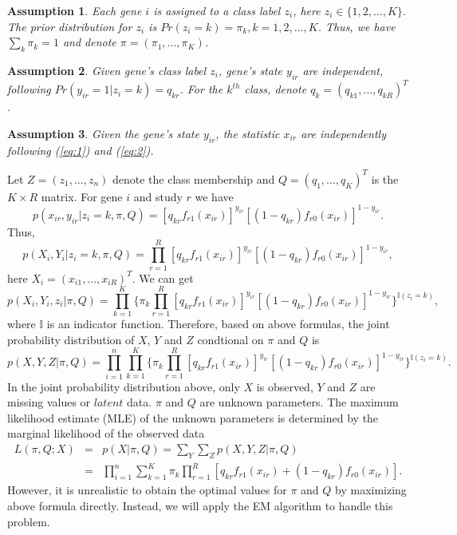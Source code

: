 \documentclass[11pt, oneside]{article}   	%
\newtheorem{assumption}{Assumption}
\begin{document}
\begin{assumption} Each gene $i$ is assigned to a class label $z_i$, here $z_i\in \{1,2,\ldots,K\}$. The prior distribution for $z_i$ is $Pr(z_i=k)=\pi_k, k=1,2,\ldots,K $. Thus, we have $\sum_k \pi_k=1$ and denote $ \pi=(\pi_1,\ldots,\pi_K)$.
\end{assumption}
\begin{assumption} Given gene's class label $z_i$, gene's state $y_{ir}$ are independent, following $ Pr(y_{ir}=1|z_i =k)=q_{kr}$. For the $k^{th}$ class, denote $q_k=(q_{k1},\ldots,q_{kR})^T$. 
\end{assumption}
\begin{assumption}Given the gene's state $y_{ir}$, the statistic $x_{ir}$ are independently following (\ref{eq:1}) and (\ref{eq:2}).
\end{assumption}

Let $Z = (z_1,\ldots,z_n)$ denote the class membership and $ Q = (q_1,\ldots,q_K)^T$ is the $K \times R$ matrix. For gene $i$ and study $r$ we have 
\begin{equation*}
p(x_{ir},y_{ir}|z_i=k,\pi,Q) = [q_{kr}f_{r1}(x_{ir})]^{y_{ir}}[(1-q_{kr})f_{r0}(x_{ir})]^{1-y_{ir}}.
\end{equation*}
Thus,
\begin{equation*}
p(X_{i},Y_{i}|z_i=k,\pi,Q) = \prod_{r=1}^R [q_{kr}f_{r1}(x_{ir})]^{y_{ir}}[(1-q_{kr})f_{r0}(x_{ir})]^{1-y_{ir}},
\end{equation*}
here $X_{i}=(x_{i1},\ldots, x_{iR})^T$. We can get
\begin{equation*}
p(X_{i},Y_{i}, z_i|\pi,Q) = \prod_{k=1}^K \{\pi_k \prod_{r=1}^R [q_{kr}f_{r1}(x_{ir})]^{y_{ir}}[(1-q_{kr})f_{r0}(x_{ir})]^{1-y_{ir}}\}^{\mathbb {I}(z_i=k)},
\end{equation*}
where $\mathbb {I}$  is an indicator function. Therefore, based on above formulas, the joint probability distribution of $X$, $Y$ and $Z$ condtional on $\pi$ and $Q$ is
\begin{equation}
p(X,Y, Z|\pi,Q) =\prod_{i=1}^n \prod_{k=1}^K \{\pi_k \prod_{r=1}^R [q_{kr}f_{r1}(x_{ir})]^{y_{ir}}[(1-q_{kr})f_{r0}(x_{ir})]^{1-y_{ir}}\}^{\mathbb {I}(z_i=k)}.
\end{equation}
In the joint probability distribution above, only $X$ is observed, $Y$ and $Z$ are missing values or $latent$ data. $\pi$ and $Q$ are unknown parameters. The maximum likelihood estimate (MLE) of the unknown parameters is determined by the marginal likelihood of the observed data
\begin{eqnarray}
L(\pi,Q;X) &= &p(X|\pi,Q) = \sum_Y \sum_Z p(X,Y, Z|\pi,Q)  \nonumber \\
&=& \prod_{i=1}^n\sum_{k=1}^K \pi_k\prod_{r=1}^R [q_{kr}f_{r1}(x_{ir})+(1-q_{kr})f_{r0}(x_{ir})].
\end{eqnarray}
However, it is unrealistic to obtain the optimal values for $\pi$ and $Q$ by maximizing above formula directly. Instead, we will apply the EM algorithm to handle this problem. 
\end{document}
